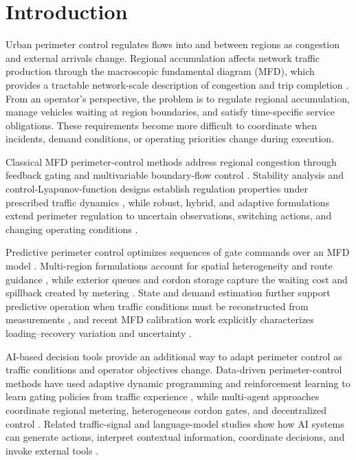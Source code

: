 \documentclass[journal,10pt]{IEEEtran}
\begin{document}
\section{Introduction}
\label{sec:new-introduction}

Urban perimeter control regulates flows into and between regions as
congestion and external arrivals change. Regional accumulation affects
network traffic production through the macroscopic fundamental diagram
(MFD), which provides a tractable network-scale description of congestion
and trip completion
\cite{daganzo2007gridlock,geroliminis2008existence,daganzo2008analytical,geroliminis2011properties,leclercq2014cross}.
From an operator's perspective, the problem is to regulate regional
accumulation, manage vehicles waiting at region boundaries, and satisfy
time-specific service obligations. These requirements become more difficult
to coordinate when incidents, demand conditions, or operating priorities
change during execution.

Classical MFD perimeter-control methods address regional congestion through
feedback gating and multivariable boundary-flow control
\cite{keyvan2012gating,aboudolas2013perimeter}. Stability analysis and
control-Lyapunov-function designs establish regulation properties under
prescribed traffic dynamics \cite{haddad2012stability,zhong2018robust},
while robust, hybrid, and adaptive formulations extend perimeter regulation
to uncertain observations, switching actions, and changing operating
conditions
\cite{mohajerpoor2020hinf,hajiahmadi2015hybrid,haddad2020adaptive,kouvelas2017adaptive}.

Predictive perimeter control optimizes sequences of gate commands over an
MFD model \cite{geroliminis2013mpc}. Multi-region formulations account for
spatial heterogeneity and route guidance
\cite{ramezani2015heterogeneity,sirmatel2018economic}, while exterior queues
and cordon storage capture the waiting cost and spillback created by
metering \cite{haddad2017queues,ni2019cordon}. State and demand estimation
further support predictive operation when traffic conditions must be
reconstructed from measurements \cite{sirmatel2019estimation}, and recent
MFD calibration work explicitly characterizes loading--recovery variation
and uncertainty \cite{ma2025mfduq}.

AI-based decision tools provide an additional way to adapt perimeter control
as traffic conditions and operator objectives change. Data-driven
perimeter-control methods have used adaptive dynamic programming and
reinforcement learning to learn gating policies from traffic experience
\cite{chen2022dataefficient,chen2024iadp}, while multi-agent approaches
coordinate regional metering, heterogeneous cordon gates, and decentralized
control \cite{zhou2023scalable,yu2025physicsperimeter,li2024beyond}. Related
traffic-signal and language-model studies show how AI systems can generate
actions, interpret contextual information, coordinate decisions, and invoke
external tools
\cite{wei2019presslight,wei2019colight,llmlight2023,masri2025llmtraffic,collmlight2025,trafficgpt2024,openti2024,virtualpolice2026,yu2025statespace}.
\end{document}
